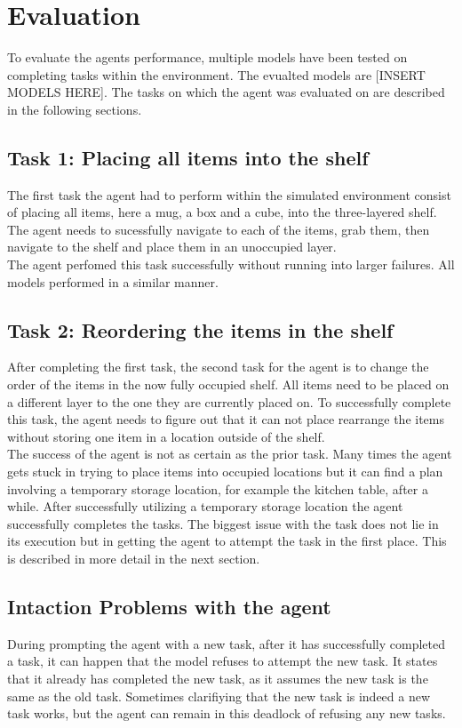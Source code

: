 \documentclass[../report.tex]{subfiles}
\begin{document}
\section{Evaluation}
\label{sec:evaluation}
To evaluate the agents performance, multiple models have been tested on completing tasks within the environment. The evualted models are [INSERT MODELS HERE]. The tasks on which the agent was evaluated on are described in the following sections.

\subsection{Task 1: Placing all items into the shelf}
The first task the agent had to perform within the simulated environment consist of placing all items, here a mug, a box and a cube, into the three-layered shelf. The agent needs to sucessfully navigate to each of the items, grab them, then navigate to the shelf and place them in an unoccupied layer. \\
The agent perfomed this task successfully without running into larger failures. All models performed in a similar manner.

\subsection{Task 2: Reordering the items in the shelf}
After completing the first task, the second task for the agent is to change the order of the items in the now fully occupied shelf. All items need to be placed on a different layer to the one they are currently placed on. To successfully complete this task, the agent needs to figure out that it can not place rearrange the items without storing one item in a location outside of the shelf. \\
The success of the agent is not as certain as the prior task. Many times the agent gets stuck in trying to place items into occupied locations but it can find a plan involving a temporary storage location, for example the kitchen table, after a while. After successfully utilizing a temporary storage location the agent successfully completes the tasks. The biggest issue with the task does not lie in its execution but in getting the agent to attempt the task in the first place. This is described in more detail in the next section.

\subsection{Intaction Problems with the agent}
During prompting the agent with a new task, after it has successfully completed a task, it can happen that the model refuses to attempt the new task. It states that it already has completed the new task, as it assumes the new task is the same as the old task. Sometimes clarifiying that the new task is indeed a new task works, but the agent can remain in this deadlock of refusing any new tasks.
\end{document}
